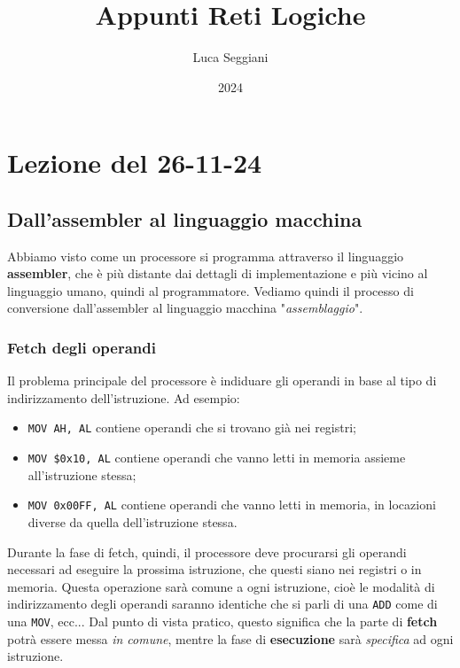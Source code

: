 \documentclass[a4paper,11pt]{article}
\title{Appunti Reti Logiche}
\author{Luca Seggiani}
\date{2024}
\begin{document}
\section{Lezione del 26-11-24}

\thispagestyle{empty}
\pagestyle{fancy}

\subsection{Dall'assembler al linguaggio macchina}
Abbiamo visto come un processore si programma attraverso il linguaggio \textbf{assembler}, che è più distante dai dettagli di implementazione e più vicino al linguaggio umano, quindi al programmatore.
Vediamo quindi il processo di conversione dall'assembler al linguaggio macchina "\textit{assemblaggio}".

\subsubsection{Fetch degli operandi}
Il problema principale del processore è indiduare gli operandi in base al tipo di indirizzamento dell'istruzione.
Ad esempio:
\begin{itemize}
	\item \lstinline|MOV AH, AL| contiene operandi che si trovano già nei registri;
	\item \lstinline|MOV $0x10, AL| contiene operandi che vanno letti in memoria assieme all'istruzione stessa;
	\item \lstinline|MOV 0x00FF, AL| contiene operandi che vanno letti in memoria, in locazioni diverse da quella dell'istruzione stessa.
\end{itemize}

Durante la fase di fetch, quindi, il processore deve procurarsi gli operandi necessari ad eseguire la prossima istruzione, che questi siano nei registri o in memoria.
Questa operazione sarà comune a ogni istruzione, cioè le modalità di indirizzamento degli operandi saranno identiche che si parli di una \lstinline|ADD| come di una \lstinline|MOV|, ecc...
Dal punto di vista pratico, questo significa che la parte di \textbf{fetch} potrà essere messa \textit{in comune}, mentre la fase di \textbf{esecuzione} sarà \textit{specifica} ad ogni istruzione.
\end{document}
